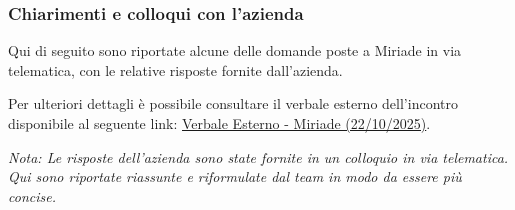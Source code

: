 \documentclass[a4paper,11pt]{article}
\begin{document}
\subsubsection{Chiarimenti e colloqui con l'azienda}
Qui di seguito sono riportate alcune delle domande poste a Miriade in via telematica, con le relative risposte fornite dall'azienda. 

Per ulteriori dettagli è possibile consultare il verbale esterno dell'incontro disponibile al seguente link: \href{https://bugbustersunipd.github.io/BugBusterSite/assets/docs/VERBALI_Esterni/VE_22_10_2025_Miriade/VE_22_10_2025_Miriade_.pdf}{Verbale Esterno - Miriade (22/10/2025)}.

\begin{center}
\small\textit{Nota: Le risposte dell'azienda sono state fornite in  un colloquio in via telematica. Qui sono riportate riassunte e riformulate dal team in modo da essere più concise.}
\end{center}
\end{document}

